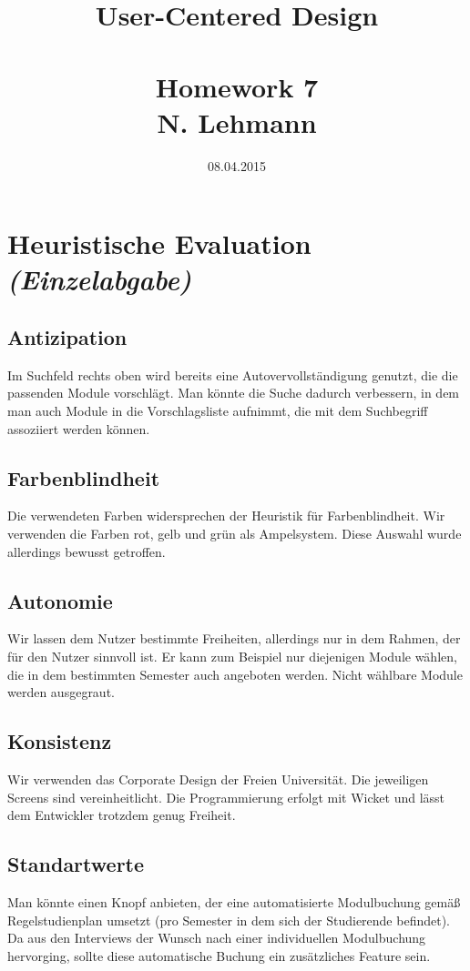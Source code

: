 \documentclass{article}
\title{User-Centered Design\\~\\Homework 7\\ \small{N. Lehmann}}
\date{08.04.2015}
\begin{document}
\section{Heuristische Evaluation \textit{(Einzelabgabe)}}

\subsection{Antizipation}

Im Suchfeld rechts oben wird bereits eine Autovervollständigung genutzt, die die passenden Module vorschlägt. Man könnte die Suche dadurch verbessern, in dem man auch Module in die Vorschlagsliste aufnimmt, die mit dem Suchbegriff assoziiert werden können.

\subsection{Farbenblindheit}

Die verwendeten Farben widersprechen der Heuristik für Farbenblindheit. Wir verwenden die Farben rot, gelb und grün als Ampelsystem. Diese Auswahl wurde allerdings bewusst getroffen.

\subsection{Autonomie}

Wir lassen dem Nutzer bestimmte Freiheiten, allerdings nur in dem Rahmen, der für den Nutzer sinnvoll ist. Er kann zum Beispiel nur diejenigen Module wählen, die in dem bestimmten Semester auch angeboten werden. Nicht wählbare Module werden ausgegraut.

\subsection{Konsistenz}

Wir verwenden das Corporate Design der Freien Universität. Die jeweiligen Screens sind vereinheitlicht. Die Programmierung erfolgt mit Wicket und lässt dem Entwickler trotzdem genug Freiheit.

\subsection{Standartwerte}

Man könnte einen Knopf anbieten, der eine automatisierte Modulbuchung gemäß Regelstudienplan umsetzt (pro Semester in dem sich der Studierende befindet). Da aus den Interviews der Wunsch nach einer individuellen Modulbuchung hervorging, sollte diese automatische Buchung ein zusätzliches Feature sein.
\end{document}
